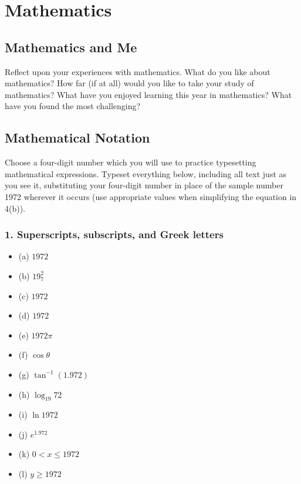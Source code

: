 \documentclass[a4paper,15pt]{article}
\begin{document}
\section{Mathematics}

\subsection{Mathematics and Me}
Reflect upon your experiences with mathematics. What do you like about mathematics? How far (if at all) would you like to take your study of mathematics? What have you enjoyed learning this year in mathematics? What have you found the most challenging?

\subsection{Mathematical Notation}
Choose a four-digit number which you will use to practice typesetting mathematical expressions. Typeset everything below, including all text just as you see it, substituting your four-digit number in place of the sample number 1972 wherever it occurs (use appropriate values when simplifying the equation in 4(b)).

\subsubsection*{1. Superscripts, subscripts, and Greek letters}
\begin{itemize}
    \item (a) \(1972\)
    \item (b) \(19_7^2\)
    \item (c) \(1972\)
    \item (d) \(1972\)
    \item (e) \(1972\pi\)
    \item (f) \(\cos \theta\)
    \item (g) \(\tan^{-1} (1.972)\)
    \item (h) \(\log_{19} 72\)
    \item (i) \(\ln 1972\)
    \item (j) \(e^{1.972}\)
    \item (k) \(0 < x \leq 1972\)
    \item (l) \(y \geq 1972\)
\end{itemize}
\end{document}
